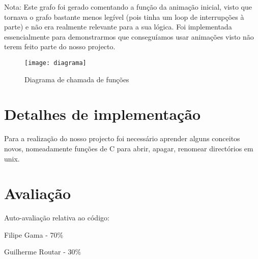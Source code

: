 \documentclass[a4paper]{article}
\begin{document}
Nota: Este grafo foi gerado comentando a função da animação inicial, visto que tornava o grafo bastante menos legível (pois tinha um loop de interrupções à parte) e não era realmente relevante para a sua lógica. Foi implementada essencialmente para demonstrarmos que conseguíamos usar animações visto não terem feito parte do nosso projecto.  

\begin{figure}[h]
\centering
\texttt{[image: diagrama]}
\caption{Diagrama de chamada de funções}
\end{figure}

\newpage
\section{Detalhes de implementação}

Para a realização do nosso projecto foi necessário aprender alguns conceitos novos, nomeadamente funções de C para  abrir, apagar, renomear directórios em unix. 

\newpage
\section{Avaliação}

Auto-avaliação relativa ao código:\bigskip

Filipe Gama - 70\%

Guilherme Routar - 30\%\bigskip
\end{document}
